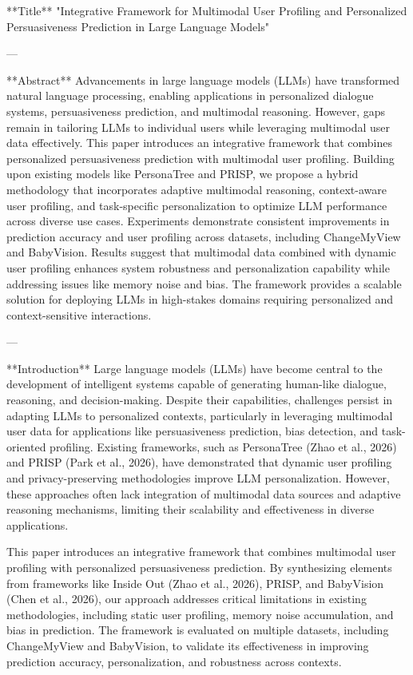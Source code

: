 **Title**  
"Integrative Framework for Multimodal User Profiling and Personalized Persuasiveness Prediction in Large Language Models"

---

**Abstract**  
Advancements in large language models (LLMs) have transformed natural language processing, enabling applications in personalized dialogue systems, persuasiveness prediction, and multimodal reasoning. However, gaps remain in tailoring LLMs to individual users while leveraging multimodal user data effectively. This paper introduces an integrative framework that combines personalized persuasiveness prediction with multimodal user profiling. Building upon existing models like PersonaTree and PRISP, we propose a hybrid methodology that incorporates adaptive multimodal reasoning, context-aware user profiling, and task-specific personalization to optimize LLM performance across diverse use cases. Experiments demonstrate consistent improvements in prediction accuracy and user profiling across datasets, including ChangeMyView and BabyVision. Results suggest that multimodal data combined with dynamic user profiling enhances system robustness and personalization capability while addressing issues like memory noise and bias. The framework provides a scalable solution for deploying LLMs in high-stakes domains requiring personalized and context-sensitive interactions.

---

**Introduction**  
Large language models (LLMs) have become central to the development of intelligent systems capable of generating human-like dialogue, reasoning, and decision-making. Despite their capabilities, challenges persist in adapting LLMs to personalized contexts, particularly in leveraging multimodal user data for applications like persuasiveness prediction, bias detection, and task-oriented profiling. Existing frameworks, such as PersonaTree (Zhao et al., 2026) and PRISP (Park et al., 2026), have demonstrated that dynamic user profiling and privacy-preserving methodologies improve LLM personalization. However, these approaches often lack integration of multimodal data sources and adaptive reasoning mechanisms, limiting their scalability and effectiveness in diverse applications.

This paper introduces an integrative framework that combines multimodal user profiling with personalized persuasiveness prediction. By synthesizing elements from frameworks like Inside Out (Zhao et al., 2026), PRISP, and BabyVision (Chen et al., 2026), our approach addresses critical limitations in existing methodologies, including static user profiling, memory noise accumulation, and bias in prediction. The framework is evaluated on multiple datasets, including ChangeMyView and BabyVision, to validate its effectiveness in improving prediction accuracy, personalization, and robustness across contexts.

